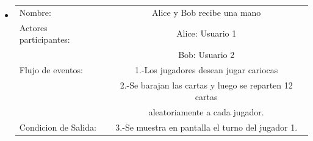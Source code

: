 \begin{itemize}
    \item 
    \begin{tabular}{ l | c  }
        Nombre:            & Alice y Bob recibe una mano \\
        Actores participantes:          & Alice: Usuario  1    \\
                                        & Bob: Usuario    2    \\\hline
        Flujo de eventos:               & 1.-Los jugadores desean jugar cariocas    \\
                                        & 2.-Se barajan las cartas y luego se reparten 12 cartas\\
                                        & aleatoriamente a cada jugador. \\\hline
        Condicion de Salida:            & 3.-Se muestra en pantalla el turno del jugador 1.  \\
    \end{tabular}


\end{itemize}
